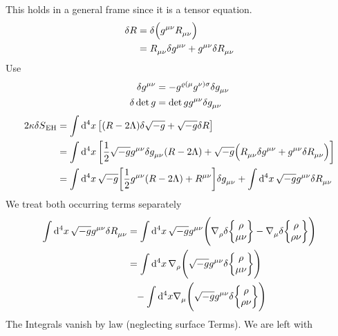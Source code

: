 This holds in a general frame since it is a tensor equation.
\begin{equation}
\begin{split}
\delta R &=\delta \left(\tensor{g}{^\mu^\nu}\tensor{R}{_\mu_\nu}\right)\\
&=\tensor{R}{_\mu_\nu}\delta\tensor{g}{^\mu^\nu}
+\tensor{g}{^\mu^\nu}\delta\tensor{R}{_\mu_\nu}\\
\end{split}
\end{equation}
Use 
\begin{align}
\delta\tensor{g}{^\mu^\nu}
&=-\tensor{g}{^\varrho^{(\mu}}\tensor{g}{^{\nu)}^\sigma}\delta\tensor{g}{_\mu_\nu}\\
\delta\det g&=\det g \tensor{g}{^\mu^\nu}\delta
\tensor{g}{_\mu_\nu}
\end{align}
\begin{equation}
\begin{split}
2\kappa\delta S\textsubscript{EH}
&=\fourint \left[
(R-2\Lambda)\delta\sqrt{-g}+\sqrt{-g}\delta R\right]\\
&=\fourint \left[
\frac{1}{2}\sqrt{-g}\tensor{g}{^\mu^\nu}\delta\tensor{g}{_\mu_\nu}
(R-2\Lambda)+\sqrt{-g}\left(\tensor{R}{_\mu_\nu}\delta\tensor{g}{^\mu^\nu}
+\tensor{g}{^\mu^\nu}\delta\tensor{R}{_\mu_\nu}\right)\right]\\
&=\fourint \sqrt{-g}\left[
\frac{1}{2}\tensor{g}{^\mu^\nu}
(R-2\Lambda)+\tensor{R}{^\mu^\nu}\right]\delta\tensor{g}{_\mu_\nu}
+\fourint \sqrt{-g}\tensor{g}{^\mu^\nu}\delta\tensor{R}{_\mu_\nu}
\\
\end{split}
\end{equation}
We treat both occurring terms separately
\begin{equation}
\begin{split}
\fourint \sqrt{-g}\tensor{g}{^\mu^\nu}\delta\tensor{R}{_\mu_\nu}
&=\fourint \sqrt{-g}\tensor{g}{^\mu^\nu}\left(\tensor{\nabla}{_\rho}\delta
\cSym{\rho}{\mu}{\nu} -\tensor{\nabla}{_\mu}\delta \cSym{\rho}{\rho}{\nu}\right)
\\
&=\fourint \tensor{\nabla}{_\rho}\left(\sqrt{-g}\tensor{g}{^\mu^\nu}\delta
\cSym{\rho}{\mu}{\nu}\right)\\
&\phantom{=}-\int\dif{}^4 x \tensor{\nabla}{_\mu}\left(\sqrt{-g}\tensor{g}{^\mu^\nu}\delta
\cSym{\rho}{\rho}{\nu}\right)
\end{split}
\end{equation}
The Integrals vanish by  law (neglecting surface Terms). We are left
with
